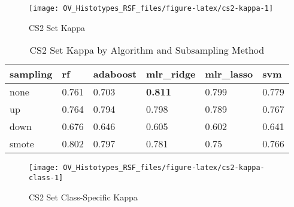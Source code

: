 \documentclass[
]{report}
\begin{document}
\begin{figure}[H]

{\centering \texttt{[image: OV\_Histotypes\_RSF\_files/figure-latex/cs2-kappa-1]} 

}

\caption{CS2 Set Kappa}\label{fig:cs2-kappa}
\end{figure}

\begin{table}

\caption{\label{tab:cs2-kappa-table}CS2 Set Kappa by Algorithm and Subsampling Method}
\centering
\begin{tabular}[t]{l|l|l|l|l|l}
\hline
sampling & rf & adaboost & mlr\_ridge & mlr\_lasso & svm\\
\hline
none & 0.761 & 0.703 & \textbf{0.811} & 0.799 & 0.779\\
\hline
up & 0.764 & 0.794 & 0.798 & 0.789 & 0.767\\
\hline
down & 0.676 & 0.646 & 0.605 & 0.602 & 0.641\\
\hline
smote & 0.802 & 0.797 & 0.781 & 0.75 & 0.766\\
\hline
\end{tabular}
\end{table}

\begin{figure}[H]

{\centering \texttt{[image: OV\_Histotypes\_RSF\_files/figure-latex/cs2-kappa-class-1]} 

}

\caption{CS2 Set Class-Specific Kappa}\label{fig:cs2-kappa-class}
\end{figure}
\end{document}
